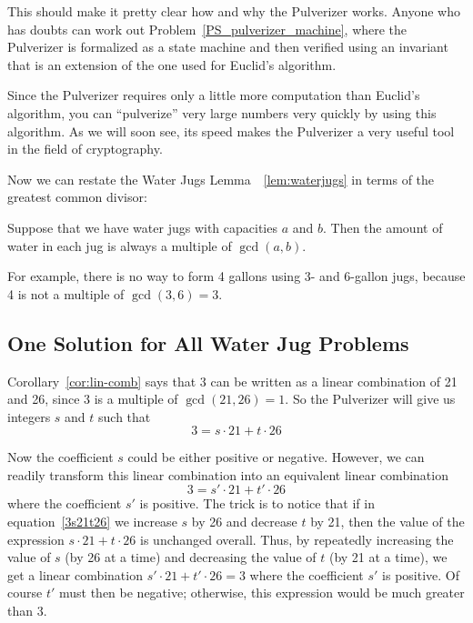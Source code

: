 This should make it pretty clear how and why the Pulverizer works.
Anyone who has doubts can work out
Problem~\ref{PS_pulverizer_machine}, where the Pulverizer is
formalized as a state machine and then verified using an invariant
that is an extension of the one used for Euclid's algorithm.

Since the Pulverizer requires only a little more computation than
Euclid's algorithm, you can ``pulverize'' very large numbers very
quickly by using this algorithm.  As we will soon see, its speed makes
the Pulverizer a very useful tool in the field of cryptography.

Now we can restate the Water Jugs Lemma~~\ref{lem:waterjugs} in terms
of the greatest common divisor:
\begin{corollary}\label{cor:waterjugs}
Suppose that we have water jugs with capacities $a$ and $b$.  Then the
amount of water in each jug is always a multiple of $\gcd(a, b)$.
\end{corollary}
For example, there is no way to form 4 gallons using 3- and 6-gallon
jugs, because 4 is not a multiple of $\gcd(3, 6) = 3$.

\subsection{One Solution for All Water Jug Problems}\label{all_jugs_son_sec}

Corollary~\ref{cor:lin-comb} says that 3 can be written as a linear
combination of 21 and 26, since 3 is a multiple of $\gcd(21, 26) = 1$.
So the Pulverizer will give us integers $s$ and $t$ such that
\begin{equation}\label{3s21t26}
3 = s \cdot 21 + t \cdot 26
\end{equation}

Now the coefficient $s$ could be either positive or negative.
However, we can readily transform this linear combination into an
equivalent linear combination
\begin{equation}\label{3sprime21}
3 = s' \cdot 21 + t' \cdot 26
\end{equation}
where the coefficient $s'$ is positive.  The trick is to notice that
if in equation~\eqref{3s21t26} we increase $s$ by 26 and decrease $t$
by 21, then the value of the expression $s \cdot 21 + t \cdot 26$ is
unchanged overall.  Thus, by repeatedly increasing the value of $s$
(by 26 at a time) and decreasing the value of $t$ (by 21 at a time),
we get a linear combination $s' \cdot 21 + t' \cdot 26 = 3$ where the
coefficient $s'$ is positive.  Of course $t'$ must then be negative;
otherwise, this expression would be much greater than 3.


